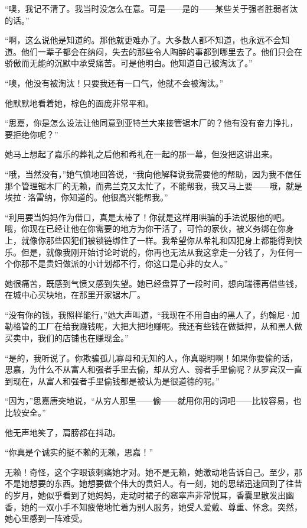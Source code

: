 \par “噢，我记不清了。我当时没怎么在意。可是——是的——某些关于强者胜弱者汰的话。”
\par “啊，这么说他是知道的。那他就更难办了。大多数人都不知道，也永远不会知道。他们一辈子都会在纳闷，失去的那些令人陶醉的事都到哪里去了。他们只会在骄傲而无能的沉默中承受痛苦。可是他明白。他知道自己被淘汰了。”
\par “噢，他没有被淘汰！只要我还有一口气，他就不会被淘汰。”
\par 他默默地看着她，棕色的面庞非常平和。
\par “思嘉，你是怎么设法让他同意到亚特兰大来接管锯木厂的？他有没有奋力挣扎，要拒绝你呢？”
\par 她马上想起了嘉乐的葬礼之后他和希礼在一起的那一幕，但没把这讲出来。
\par “哦，当然没有，”她气愤地回答说，“我向他解释说我需要他的帮助，因为我不信任那个管理锯木厂的无赖，而弗兰克又太忙了，不能帮我，我又马上要——哦，就是埃拉·洛雷纳，你知道的。他很高兴能帮我。”
\par “利用要当妈妈作为借口，真是太棒了！你就是这样用哄骗的手法说服他的吧。哦，你现在已经让他在你需要的地方为你干活了，可怜的家伙，被义务绑在你身上，就像你那些囚犯们被锁链绑住了一样。我希望你从希礼和囚犯身上都能得到快乐。但是，就像我刚开始讨论时说的，你再也无法从我这拿走一分钱了，为任何一个你那不是贵妇做派的小计划都不行，你这口是心非的女人。”
\par 她很痛苦，既感到气愤又感到失望。她已经盘算了一段时间，想向瑞德再借些钱，在城中心买块地，在那里开家锯木厂。
\par “没有你的钱，我照样能行，”她大声叫道，“我现在不用自由的黑人了，约翰尼·加勒格管的工厂在给我赚钱呢，大把大把地赚呢。我还有些钱在做抵押，从和黑人做买卖中，我们的店铺也在赚现金。”
\par “是的，我听说了。你欺骗孤儿寡母和无知的人，你真聪明啊！如果你要偷的话，思嘉，为什么不从富人和强者手里去偷，却从穷人、弱者手里偷呢？从罗宾汉一直到现在，从富人和强者手里偷钱都是被认为是很道德的呢。”
\par “因为，”思嘉唐突地说，“从穷人那里——偷——就用你用的词吧——比较容易，也比较安全。”
\par 他无声地笑了，肩膀都在抖动。
\par “你真是个诚实的挺不赖的无赖，思嘉！”
\par 无赖！奇怪，这个字眼该刺痛她才对。她不是无赖，她激动地告诉自己。至少，那不是她想要的东西。她想要做个伟大的贵妇人。有一刻，她的思绪迅速回到了往昔的岁月，她似乎看到了她妈妈，走动时裙子的窸窣声非常悦耳，香囊里散发出幽香，她的一双小手不知疲倦地忙着为别人服务，她受人爱戴、尊重、怀念。突然，她心里感到一阵难受。

